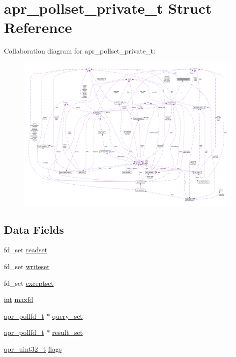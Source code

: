 \hypertarget{structapr__pollset__private__t}{}\section{apr\+\_\+pollset\+\_\+private\+\_\+t Struct Reference}
\label{structapr__pollset__private__t}


Collaboration diagram for apr\+\_\+pollset\+\_\+private\+\_\+t\+:
\nopagebreak
\begin{figure}[H]
\begin{center}
\leavevmode
\includegraphics[width=350pt]{structapr__pollset__private__t__coll__graph}
\end{center}
\end{figure}
\subsection*{Data Fields}
\begin{DoxyCompactItemize}
\item 
fd\+\_\+set \hyperlink{structapr__pollset__private__t_af8a836217a363e720b9aa67eb7818fd7}{readset}
\item 
fd\+\_\+set \hyperlink{structapr__pollset__private__t_a2d2a3e11cb99f05bc27d8fab814c3d51}{writeset}
\item 
fd\+\_\+set \hyperlink{structapr__pollset__private__t_aee9838e037c59bcc458087658c5f27d7}{exceptset}
\item 
\hyperlink{pcre_8txt_a42dfa4ff673c82d8efe7144098fbc198}{int} \hyperlink{structapr__pollset__private__t_af8f5a2c10c601e7c48b5fa3435a9dc25}{maxfd}
\item 
\hyperlink{structapr__pollfd__t}{apr\+\_\+pollfd\+\_\+t} $\ast$ \hyperlink{structapr__pollset__private__t_a2f0cbfddbc4f72d98097e4fd4ef402c4}{query\+\_\+set}
\item 
\hyperlink{structapr__pollfd__t}{apr\+\_\+pollfd\+\_\+t} $\ast$ \hyperlink{structapr__pollset__private__t_a299df5c2a80805ce10080a7dc24b7717}{result\+\_\+set}
\item 
\hyperlink{group__apr__platform_ga558548a135d8a816c4787250744ea147}{apr\+\_\+uint32\+\_\+t} \hyperlink{structapr__pollset__private__t_a2c3aae5cacc8ba85bd686578dea9147f}{flags}
\end{DoxyCompactItemize}


